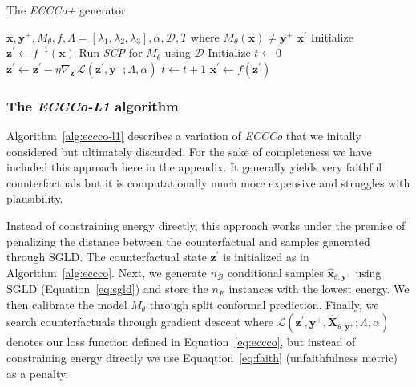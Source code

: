 \begin{algorithm*}[h]
  \caption{The \textit{ECCCo+} generator}\label{alg:eccco-plus}
  \begin{algorithmic}[1]
    \Require $\mathbf{x}, \mathbf{y}^+, M_{\theta}, f, \Lambda=[\lambda_1,\lambda_2,\lambda_3], \alpha, \mathcal{D}, T$ where $M_{\theta}(\mathbf{x})\neq\mathbf{y}^+$
    \Ensure $\mathbf{x}^\prime$
    \State Initialize $\mathbf{z}^\prime \gets f^{-1}(\mathbf{x})$ 
    \State Run \textit{SCP} for $M_{\theta}$ using $\mathcal{D}$ 
    \State Initialize $t \gets 0$
     
    \State $\mathbf{z}^\prime \gets \mathbf{z}^\prime - \eta \nabla_{\mathbf{z}^\prime} \mathcal{L}(\mathbf{z}^\prime,\mathbf{y}^+; \Lambda, \alpha)$ 
    \State $t \gets t+1$
    \EndWhile
    \State $\mathbf{x}^\prime \gets f(\mathbf{z}^\prime)$ 
  \end{algorithmic}
\end{algorithm*}

\subsubsection{The \textit{ECCCo-L1} algorithm}

Algorithm~\ref{alg:eccco-l1} describes a variation of \textit{ECCCo} that we initally considered but ultimately discarded. For the sake of completeness we have included this approach here in the appendix. It generally yields very faithful counterfactuals but it is computationally much more expensive and struggles with plausibility.

Instead of constraining energy directly, this approach works under the premise of penalizing the distance between the counterfactual and samples generated through SGLD. The counterfactual state $\mathbf{z}^\prime$ is initialized as in Algorithm~\ref{alg:eccco}. Next, we generate $n_{\mathcal{B}}$ conditional samples $\hat{\mathbf{x}}_{\theta,\mathbf{y}^+}$ using SGLD (Equation~\ref{eq:sgld}) and store the $n_E$ instances with the lowest energy. We then calibrate the model $M_{\theta}$ through split conformal prediction. Finally, we search counterfactuals through gradient descent where $\mathcal{L}(\mathbf{z}^\prime,\mathbf{y}^+,\widehat{\mathbf{X}}_{\theta,\mathbf{y}^+}; \Lambda, \alpha)$ denotes our loss function defined in Equation~\ref{eq:eccco}, but instead of constraining energy directly we use Equaqtion~\ref{eq:faith} (unfaithfulness metric) as a penalty.


